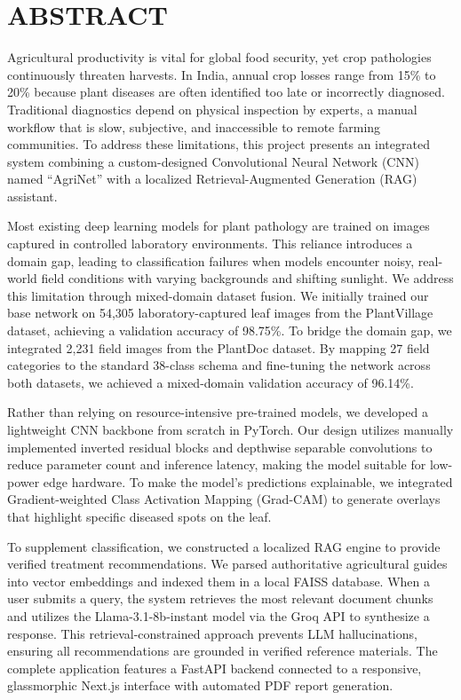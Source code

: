 \documentclass[12pt, a4paper]{report}
\begin{document}
\chapter*{ABSTRACT}

Agricultural productivity is vital for global food security, yet crop pathologies continuously threaten harvests. In India, annual crop losses range from 15\% to 20\% because plant diseases are often identified too late or incorrectly diagnosed. Traditional diagnostics depend on physical inspection by experts, a manual workflow that is slow, subjective, and inaccessible to remote farming communities. To address these limitations, this project presents an integrated system combining a custom-designed Convolutional Neural Network (CNN) named ``AgriNet'' with a localized Retrieval-Augmented Generation (RAG) assistant.

Most existing deep learning models for plant pathology are trained on images captured in controlled laboratory environments. This reliance introduces a domain gap, leading to classification failures when models encounter noisy, real-world field conditions with varying backgrounds and shifting sunlight. We address this limitation through mixed-domain dataset fusion. We initially trained our base network on 54,305 laboratory-captured leaf images from the PlantVillage dataset, achieving a validation accuracy of 98.75\%. To bridge the domain gap, we integrated 2,231 field images from the PlantDoc dataset. By mapping 27 field categories to the standard 38-class schema and fine-tuning the network across both datasets, we achieved a mixed-domain validation accuracy of 96.14\%.

Rather than relying on resource-intensive pre-trained models, we developed a lightweight CNN backbone from scratch in PyTorch. Our design utilizes manually implemented inverted residual blocks and depthwise separable convolutions to reduce parameter count and inference latency, making the model suitable for low-power edge hardware. To make the model's predictions explainable, we integrated Gradient-weighted Class Activation Mapping (Grad-CAM) to generate overlays that highlight specific diseased spots on the leaf.

To supplement classification, we constructed a localized RAG engine to provide verified treatment recommendations. We parsed authoritative agricultural guides into vector embeddings and indexed them in a local FAISS database. When a user submits a query, the system retrieves the most relevant document chunks and utilizes the Llama-3.1-8b-instant model via the Groq API to synthesize a response. This retrieval-constrained approach prevents LLM hallucinations, ensuring all recommendations are grounded in verified reference materials. The complete application features a FastAPI backend connected to a responsive, glassmorphic Next.js interface with automated PDF report generation.
\end{document}
